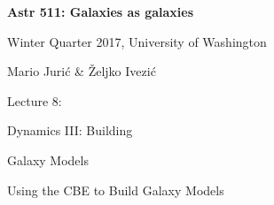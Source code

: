 \documentclass[letterpaper,landscape]{slides}
\begin{document}
\newcommand{\Spicslide}[7]{%
  \begin{slide}
     \begin{center}
        \begin{minipage}{#5in}
            \vskip #6in
            \hskip #7in
            {\scalebox{#4}{\texttt{[image: \#1.\#2]}}}
        \end{minipage}
     \end{center}
     \vfill
  \end{slide}
}
 




\begin{slide}

\phantom{x}
\vskip -2in
\begin{center}
\bfseries
{\large {\color{blue} Astr 511: Galaxies as galaxies}}
\end{center}

{\centerline {{\color{blue} 
Winter Quarter 2017, University of Washington}}}
{\centerline {{\color{blue} 
Mario Juri\'{c} \& \v{Z}eljko Ivezi\'{c} }}}

\vskip 1.6in

{\centerline {\Large {\color{red}      Lecture 8:             }}}
\vskip 0.2in 
{\centerline {\huge {\color{blue} Dynamics III: Building }}}
\vskip 0.1in
{\centerline {\huge {\color{blue} Galaxy Models }}}

\vfill
\end{slide}


\begin{slide}
\vskip 4.5in
\begin{center}
{\large \color{red} 
                  Using the CBE to Build Galaxy Models   }
\end{center}

\vskip 3.8in


\end{slide}
\end{document}
